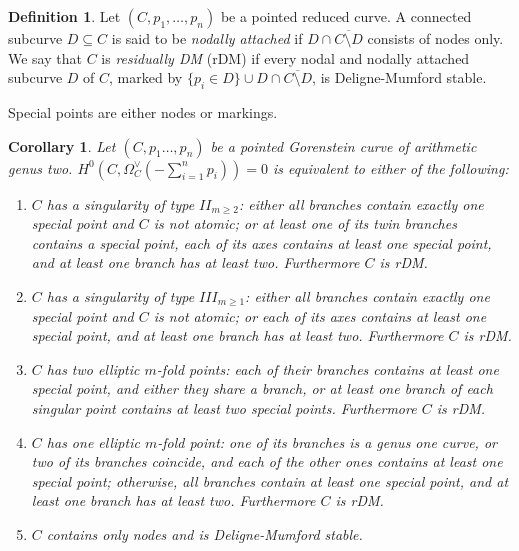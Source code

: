 \documentclass[11pt]{amsart}
\renewcommand{\to}{\rightarrow}
\theoremstyle{plain}
\newtheorem{cor}[thm]{Corollary}
\theoremstyle{definition}
\newtheorem{dfn}[thm]{Definition}
\begin{document}
\begin{dfn}
 Let $(C,p_1,\ldots,p_n)$ be a pointed reduced curve. A connected subcurve $D\subseteq C$ is said to be \emph{nodally attached} if $D\cap\overline{C\setminus D}$ consists of nodes only.
 We say that $C$ is \emph{residually DM} (rDM) if every nodal and nodally attached subcurve $D$ of $C$, marked by $\{p_i\in D\}\cup D\cap\overline{C\setminus D}$, is Deligne-Mumford stable.
\end{dfn}
Special points are either nodes or markings.
\begin{cor}\label{cor:explicitnoaut}
 Let $(C,p_1\ldots,p_n)$ be a pointed Gorenstein curve of arithmetic genus two. $H^0(C,\Omega_C^\vee(-\sum_{i=1}^n p_i))=0$ is equivalent to either of the following:
 \begin{enumerate}[leftmargin=.6cm]
  \item $C$ has a singularity of type $I\!I_{m\geq 2}$: either all branches contain exactly one special point and $C$ is not atomic; or at least one of its twin branches contains a special point, each of its axes contains at least one special point, and at least one branch has at least two. Furthermore $C$ is rDM.
  \item $C$ has a singularity of type $I\!I\!I_{m\geq 1}$: either all branches contain exactly one special point and $C$ is not atomic; or each of its axes contains at least one special point, and at least one branch has at least two. Furthermore $C$ is rDM.
  \item $C$ has two elliptic $m$-fold points: each of their branches contains at least one special point, and either they share a branch, or at least one branch of each singular point contains at least two special points. Furthermore $C$ is rDM.
  \item $C$ has one elliptic $m$-fold point: one of its branches is a genus one curve, or two of its branches coincide, and each of the other ones contains at least one special point; otherwise, all branches contain at least one special point, and at least one branch has at least two. Furthermore $C$ is rDM.
  \item $C$ contains only nodes and is Deligne-Mumford stable.
 \end{enumerate}
\end{cor}
\end{document}
